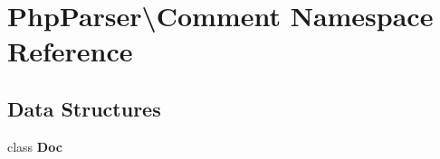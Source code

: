 \section{Php\+Parser\textbackslash{}Comment Namespace Reference}
\label{namespace_php_parser_1_1_comment}
\subsection*{Data Structures}
\begin{DoxyCompactItemize}
\item 
class {\bf Doc}
\end{DoxyCompactItemize}
